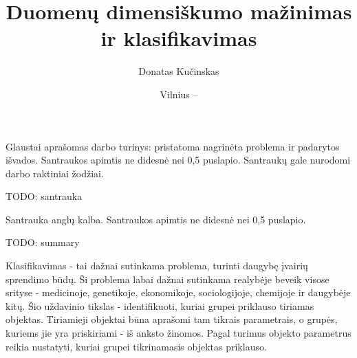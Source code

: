 \documentclass{VUMIFPSbakalaurinis}
\title{Duomenų dimensiškumo mažinimas ir klasifikavimas}
\author{Donatas Kučinskas}
\date{Vilnius – \the\year}
\newcommand{\TODO}[1]{
\colorbox{todo-background-color}{TODO: #1}
}
\begin{document}
\maketitle

\setcounter{page}{2}

Glaustai aprašomas darbo turinys: pristatoma nagrinėta problema ir padarytos
išvados. Santraukos apimtis ne didesnė nei 0,5 puslapio. Santraukų gale
nurodomi darbo raktiniai žodžiai. 

\TODO{santrauka}


Santrauka anglų kalba. Santraukos apimtis ne didesnė nei 0,5 puslapio.

\TODO{summary}


\tableofcontents







Klasifikavimas - tai dažnai sutinkama problema, turinti daugybę įvairių sprendimo būdų.
Ši problema labai dažnai sutinkama realybėje beveik visose srityse - medicinoje, genetikoje, ekonomikoje, sociologijoje, chemijoje ir daugybėje kitų.
Šio uždavinio tikslas - identifikuoti, kuriai grupei priklauso tiriamas objektas.
Tiriamieji objektai būna aprašomi tam tikrais parametrais, o grupės, kuriems jie yra priskiriami - iš anksto žinomos.
Pagal turimus objekto parametrus reikia nustatyti, kuriai grupei tikrinamasis objektas priklauso.
\end{document}
